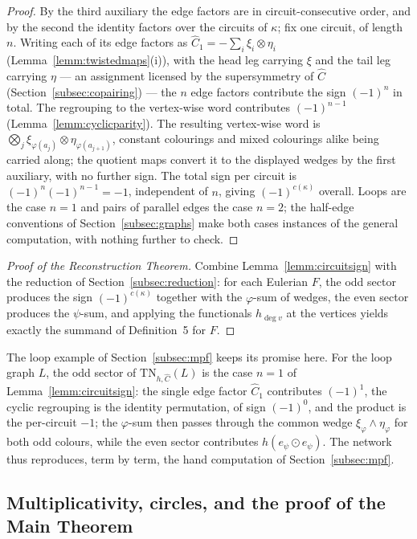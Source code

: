 \documentclass[11pt]{article}
\newcommand{\twistedC}{\widehat{C}}               %
\begin{document}
\begin{proof}
By the third auxiliary the edge factors are in
circuit-consecutive order, and by the second the identity
factors over the circuits of $\kappa$; fix one circuit, of length
$n$. Writing each of its edge factors as
$\twistedC_{1}=-\sum_{i}\xi_{i}\otimes\eta_{i}$
(Lemma~\ref{lemm:twistedmaps}(i)), with the head leg carrying
$\xi$ and the tail leg carrying $\eta$ --- an assignment licensed
by the supersymmetry of $\twistedC$
(Section~\ref{subsec:copairing}) --- the $n$ edge factors
contribute the sign $(-1)^{n}$ in total. The regrouping to the
vertex-wise word contributes $(-1)^{n-1}$
(Lemma~\ref{lemm:cyclicparity}). The resulting vertex-wise word
is $\bigotimes_{j}\xi_{\varphi(a_{j})}\otimes
\eta_{\varphi(a_{j+1})}$, constant colourings and mixed
colourings alike being carried along; the quotient maps convert
it to the displayed wedges by the first auxiliary, with no
further sign. The total sign per circuit is
$(-1)^{n}(-1)^{n-1}=-1$, independent of $n$, giving
$(-1)^{c(\kappa)}$ overall. Loops are the case $n=1$ and pairs of
parallel edges the case $n=2$; the half-edge conventions of
Section~\ref{subsec:graphs} make both cases instances of the
general computation, with nothing further to check.
\end{proof}

\begin{proof}[Proof of the Reconstruction Theorem]
Combine Lemma~\ref{lemm:circuitsign} with the reduction of
Section~\ref{subsec:reduction}: for each Eulerian $F$, the odd
sector produces the sign $(-1)^{c(\kappa)}$ together with the
$\varphi$-sum of wedges, the even sector produces the
$\psi$-sum, and applying the functionals $h_{\deg v}$ at the
vertices yields exactly the summand of Definition~5 for $F$.
\end{proof}

The loop example of Section~\ref{subsec:mpf} keeps its promise
here. For the loop graph $L$, the odd sector of
$\mathrm{TN}_{h,\twistedC}(L)$ is the case $n=1$ of
Lemma~\ref{lemm:circuitsign}: the single edge factor
$\twistedC_{1}$ contributes $(-1)^{1}$, the cyclic regrouping is
the identity permutation, of sign $(-1)^{0}$, and the product is
the per-circuit $-1$; the $\varphi$-sum then passes through the
common wedge $\xi_{\varphi}\wedge\eta_{\varphi}$ for both odd
colours, while the even sector contributes
$h(e_{\psi}\odot e_{\psi})$. The network thus reproduces, term by
term, the hand computation of Section~\ref{subsec:mpf}.

\subsection{Multiplicativity, circles, and the proof of the Main
Theorem}\label{subsec:assembly}
\end{document}
